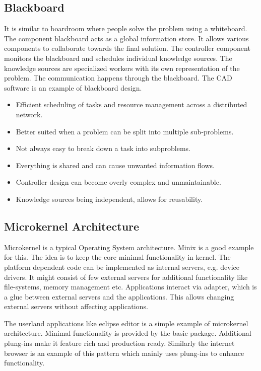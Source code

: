 \documentclass[conference]{IEEEtran}
\begin{document}
\subsection{Blackboard}
It is similar to boardroom where people solve the problem using a whiteboard. The component blackboard acts as a global information store. It allows various components to collaborate towards the final solution. The controller component monitors the blackboard and schedules individual knowledge sources. The knowledge sources are specialized workers with its own representation of the problem. The communication happens through the blackboard. The CAD software is an example of blackboard design.
\begin{itemize}
\item Efficient scheduling of tasks and resource management across a distributed network.
\item Better suited when a problem can be split into multiple sub-problems.
\item Not always easy to break down a task into subproblems.
\item Everything is shared and can cause unwanted information flows.
\item Controller design can become overly complex and unmaintainable.
\item Knowledge sources being independent, allows for reusability.
\end{itemize}

\subsection{Microkernel Architecture}
Microkernel \cite{microkernel} is a typical Operating System architecture. Minix \cite{minix} is a good example for this. The idea is to keep the core minimal functionality in kernel. The platform dependent code can be implemented as internal servers, e.g. device drivers. It might consist of few external servers for additional functionality like file-systems, memory management etc. Applications interact via adapter, which is a glue between external servers and the applications. This allows changing external servers without affecting applications.\par
The userland applications like eclipse editor is a simple example of microkernel architecture. Minimal functionality is provided by the basic package. Additional plung-ins make it feature rich and production ready. Similarly the internet browser is an example of this pattern which mainly uses plung-ins to enhance functionality.
\end{document}
